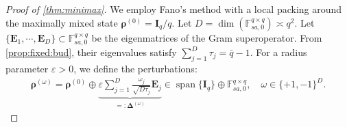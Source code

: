 \documentclass[noinfoline]{imsart}\setcounter{tocdepth}{2}
\renewcommand{\b}[1]{\mathbb{#1}} %
\newcommand{\m}[1]{\mathbf{#1}} %
\newcommand{\mb}[1]{\boldsymbol{#1}} %
\DeclareMathOperator*{\spann}{span}
\theoremstyle{plain}
\begin{document}
\begin{appendix}
\begin{proof}[Proof of \cref{thm:minimax}]
We employ Fano's method \cite{tsybakov2009introduction} with a local packing around the maximally mixed state $\mb{\rho}^{(0)}= \m{I}_{q}/q$. Let $D = \dim (\b{F}_{sa, 0}^{q \times q}) \asymp q^{2}$. Let $\{\m{E}_{1}, \cdots, \m{E}_{D}\} \subset \b{F}_{sa, 0}^{q \times q}$ be the eigenmatrices of the Gram superoperator. From \cref{prop:fixed:bud}, their eigenvalues satisfy $\sum_{j=1}^{D} \tau_{j} = \bar{q} -1$. For a radius parameter $\varepsilon > 0$, we define the perturbations:
\begin{align*}
    \mb{\rho}^{(\omega)} = \mb{\rho}^{(0)} \oplus \underbrace{\varepsilon \sum_{j=1}^{D} \frac{\omega_j}{\sqrt{D \tau_{j}}} \m{E}_{j}}_{=: \mb{\Delta}^{(\omega)}} \in \spann\{\m{I}_{q}\} \oplus \b{F}_{sa, 0}^{q \times q}, \quad \omega \in \{+1, -1\}^{D}.
\end{align*}


\end{proof}
\end{appendix}
\end{document}
